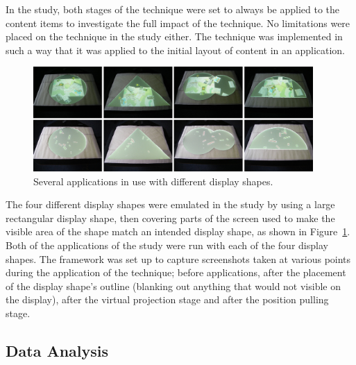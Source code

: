 \documentclass[twocolumn,compsoc]{cvm}
\begin{document}
{In the study, both stages of the technique were set to always be applied to the content items to investigate the full impact of the technique.
No limitations were placed on the technique in the study either.
The technique was implemented in such a way that it was applied to the initial layout of content in an application.

\begin{figure}[h!] 
 \centering
  \includegraphics[width=0.95\textwidth]{figures/ApplicationsInUse.jpeg} 
  \caption{Several applications in use with different display shapes.}
  \label{fig:trial}
\end{figure}

The four different display shapes were emulated in the study by using a large rectangular display shape, then covering parts of the screen used to make the visible area of the shape match an intended display shape, as shown in Figure~\ref{fig:trial}.
Both of the applications of the study were run with each of the four display shapes.
The framework was set up to capture screenshots taken at various points during the application of the technique; before applications, after the placement of the display shape's outline (blanking out anything that would not visible on the display),  after the virtual projection stage and after the position pulling stage.


\subsection{Data Analysis}
\label{subsec:dataanalysis} 



}
\end{document}
